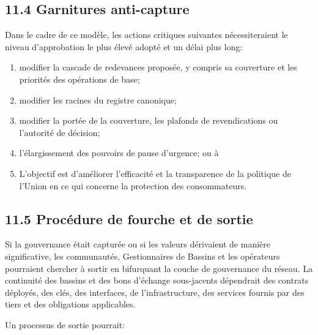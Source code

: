 \documentclass[11pt]{article}
\begin{document}
\subsection*{11.4 Garnitures anti-capture}

Dans le cadre de ce modèle, les actions critiques suivantes nécessiteraient le niveau d'approbation le plus élevé adopté et un délai plus long:

\begin{enumerate}[leftmargin=*]
\item modifier la cascade de redevances proposée, y compris sa couverture et les priorités des opérations de base;
\item modifier les racines du registre canonique;
\item modifier la portée de la couverture, les plafonds de revendications ou l'autorité de décision;
\item l'élargissement des pouvoirs de pause d'urgence; ou à
\item L'objectif est d'améliorer l'efficacité et la transparence de la politique de l'Union en ce qui concerne la protection des consommateurs.
\end{enumerate}
\subsection*{11.5 Procédure de fourche et de sortie}

Si la gouvernance était capturée ou si les valeurs dérivaient de manière significative, les communautés, Gestionnaires de Bassins et les opérateurs pourraient chercher à sortir en bifurquant la couche de gouvernance du réseau. La continuité des bassins et des bons d'échange sous-jacents dépendrait des contrats déployés, des clés, des interfaces, de l'infrastructure, des services fournis par des tiers et des obligations applicables.

Un processus de sortie pourrait:
\end{document}
